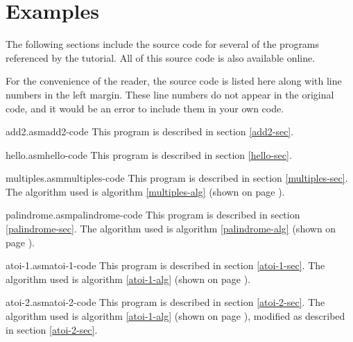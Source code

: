 
\chapter{Examples}

The following sections include the source code for
several of the programs referenced by the tutorial.
All of this source code is also available online.

For the convenience of the reader,
the source code is listed here
along with line numbers in the left margin.
These line numbers do not appear in the original code,
and it would be an error to include them in your own code.


\begin{dan-code}{add2.asm}{add2-code}{
        This program is described in section \ref{add2-sec}.
}

\end{dan-code}

\begin{dan-code}{hello.asm}{hello-code}{
        This program is described in section \ref{hello-sec}.
}

\end{dan-code}

\begin{dan-code}{multiples.asm}{multiples-code}{
        This program is described in section \ref{multiples-sec}.
        The algorithm used is algorithm \ref{multiples-alg}
        (shown on page \pageref{multiples-alg}).
}

\end{dan-code}

\begin{dan-code}{palindrome.asm}{palindrome-code}{
        This program is described in section \ref{palindrome-sec}.
        The algorithm used is algorithm \ref{palindrome-alg}
        (shown on page \pageref{palindrome-alg}).
}

\end{dan-code}

\begin{dan-code}{atoi-1.asm}{atoi-1-code}{
        This program is described in section \ref{atoi-1-sec}.
        The algorithm used is algorithm \ref{atoi-1-alg}
        (shown on page \pageref{atoi-1-alg}).
}

\end{dan-code}

\begin{dan-code}{atoi-2.asm}{atoi-2-code}{
	This program is described in section \ref{atoi-2-sec}.
	The algorithm used is algorithm \ref{atoi-1-alg}
	(shown on page \pageref{atoi-1-alg}), modified
	as described in section \ref{atoi-2-sec}.
}

\end{dan-code}

